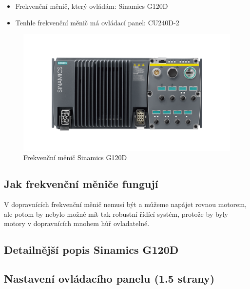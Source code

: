 
\begin{itemize}
    \item Frekvenční měnič, který ovládám: Sinamics G120D
    \item Tenhle frekvenční měnič má ovládací panel: CU240D-2 \cite{SiemensG120DGettingStarted}
\end{itemize}
\begin{figure}[H]
    \centering
    \includegraphics[width=0.8\linewidth]{images/Sinamics_G120D.png}
    \caption{Frekvenční měnič Sinamics G120D \cite{SinamicsG120D}}
    \label{fig:sinamics_G120D}
\end{figure}

\subsection{Jak frekvenční měniče fungují}\label{sec:JakFungujiFrekvencniMenice}

V dopravnících frekvenční měnič nemusí být a můžeme napájet rovnou motorem, ale potom by nebylo možné mít tak robustní řídící systém, protože by byly motory v dopravnících mnohem hůř ovladatelné.

\subsection{Detailnější popis Sinamics G120D}


\subsection{Nastavení ovládacího panelu (1.5 strany)}\label{sec:NastaveniOvladacihoPanelu}

